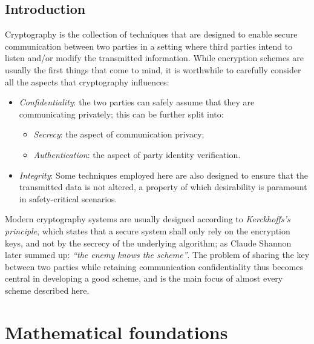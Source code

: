\documentclass[10pt, a4paper]{report}
\begin{document}
    \tableofcontents

    \chapter{Introduction}

    Cryptography is the collection of techniques that are designed to enable secure communication between two parties in a setting where third parties intend to listen and/or modify the transmitted information. While encryption schemes are usually the first things that come to mind, it is worthwhile to carefully consider all the aspects that cryptography influences:

    \begin{itemize}
        \item \emph{Confidentiality}: the two parties can safely assume that they are communicating privately; this can be further  split into:
              \begin{itemize}
                  \item \emph{Secrecy}: the aspect of communication privacy;
                  \item \emph{Authentication}: the aspect of party identity verification.
              \end{itemize}

        \item \emph{Integrity}: Some techniques employed here are also designed to ensure that the transmitted data is not  altered, a property of which desirability is paramount in safety-critical scenarios.
    \end{itemize}

    Modern cryptography systems are usually designed according to \emph{Kerckhoffs's principle}, which states that a secure system  shall only rely on the encryption keys, and not by the secrecy of the underlying algorithm; as Claude Shannon later summed up:   \emph{``the enemy knows the scheme''}. The problem of sharing the key between two parties while retaining communication   confidentiality thus becomes central in developing a good scheme, and is the main focus of almost every scheme described here.

    \part{Mathematical foundations}

    
    
    
    
    
    
    
\end{document}
